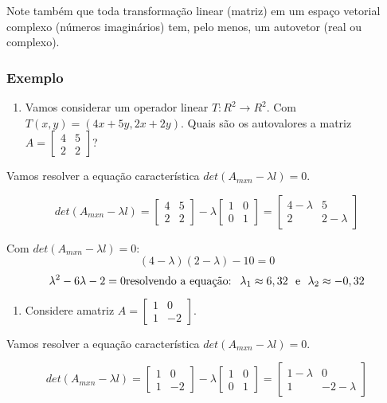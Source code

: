 \documentclass[
]{book}
\providecommand{\tightlist}{%
  \setlength{\itemsep}{0pt}\setlength{\parskip}{0pt}}
\begin{document}
Note também que toda transformação linear (matriz) em um espaço
vetorial complexo (números imaginários) tem, pelo menos, um autovetor (real ou complexo).

\hypertarget{exautovetor1}{%
\subsubsection{Exemplo}\label{exautovetor1}}

\begin{enumerate}
\def\labelenumi{\arabic{enumi}.}
\tightlist
\item
  Vamos considerar um operador linear \textbf{\(T: R^2 \rightarrow R^2\)}. Com \(T(x,y)=(4x+5y,2x+2y)\). Quais são os autovalores a matriz \(A=\begin{bmatrix} 4 &5 \\ 2 &2 \end{bmatrix}\)?
\end{enumerate}

Vamos resolver a equação característica \(det(A_{mxn}-\lambda l)=0\).

\[det(A_{mxn}-\lambda l)=\begin{bmatrix}
4 &5 \\ 
2 &2 
\end{bmatrix} - \lambda \begin{bmatrix}
1 &0 \\ 
0 &1 
\end{bmatrix} = \begin{bmatrix}
4-\lambda &5 \\ 
2 &2-\lambda 
\end{bmatrix}\]

Com \(det(A_{mxn}-\lambda l)=0:\)
\[(4-\lambda)(2-\lambda)-10=0 \]
\[\lambda^2-6\lambda-2=0 \\ \mbox{resolvendo a equação: } \ 
\lambda_1 \approx 6,32 \  \ \mbox{e} \ \ \lambda_2 \approx -0,32\]

\begin{enumerate}
\def\labelenumi{\arabic{enumi}.}
\setcounter{enumi}{1}
\tightlist
\item
  Considere amatriz \(A=\begin{bmatrix} 1 &0 \\ 1 &-2 \end{bmatrix}\).
\end{enumerate}

Vamos resolver a equação característica \(det(A_{mxn}-\lambda l)=0\).

\[det(A_{mxn}-\lambda l)=\begin{bmatrix}
1 &0 \\ 
1 &-2 
\end{bmatrix} - \lambda \begin{bmatrix}
1 &0 \\ 
0 &1 
\end{bmatrix} = \begin{bmatrix}
1-\lambda &0 \\ 
1 &-2-\lambda 
\end{bmatrix}\]
\end{document}
